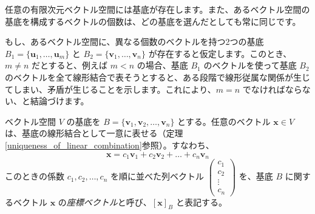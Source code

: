 \begin{thm}[基底の存在と一意性] \label{existence_and_uniqueness_of_basis}
任意の有限次元ベクトル空間には基底が存在します。また、あるベクトル空間の基底を構成するベクトルの個数は、どの基底を選んだとしても常に同じです。
\begin{proof*}
もし、あるベクトル空間に、異なる個数のベクトルを持つ2つの基底 $B_1 = \{\bm{u}_1, \ldots, \bm{u}_m\}$ と $B_2 = \{\bm{v}_1, \ldots, \bm{v}_n\}$ が存在すると仮定します。このとき、$m \neq n$ だとすると、例えば $m < n$ の場合、基底 $B_1$ のベクトルを使って基底 $B_2$ のベクトルを全て線形結合で表そうとすると、ある段階で線形従属な関係が生じてしまい、矛盾が生じることを示します。これにより、$m=n$ でなければならない、と結論づけます。
\end{proof*}
\end{thm}

\begin{dfn}[座標ベクトル]
ベクトル空間 $V$ の基底を $B = \{\bm{v}_1, \bm{v}_2, \ldots, \bm{v}_n\}$ とする。任意のベクトル $\bm{x} \in V$ は、基底の線形結合として一意に表せる（定理\ref{uniqueness_of_linear_combination}参照）。すなわち、
\[ \bm{x} = c_1 \bm{v}_1 + c_2 \bm{v}_2 + \dots + c_n \bm{v}_n \]
このときの係数 $c_1, c_2, \ldots, c_n$ を順に並べた列ベクトル $\begin{pmatrix} c_1 \\ c_2 \\ \vdots \\ c_n \end{pmatrix}$ を、基底 $B$ に関するベクトル $\bm{x}$ の\emph{座標ベクトル}と呼び、$[\bm{x}]_B$ と表記する。
\end{dfn}

